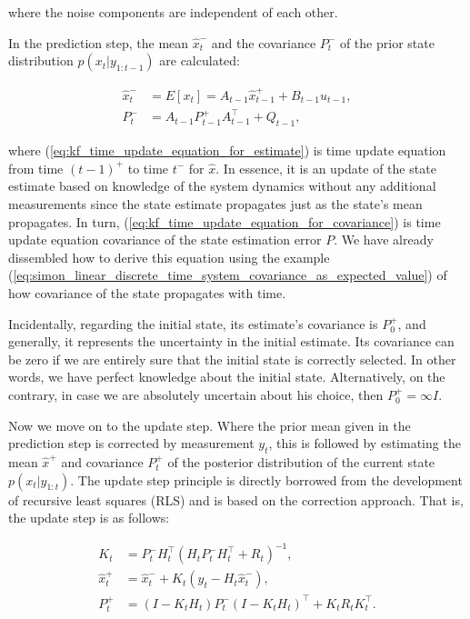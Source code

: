 \noindent where the noise components are independent of each other.

In the prediction step, the mean \(\hat{x}_t^{-}\) and the covariance \(P_t^{-}\) of the prior state distribution \(p(x_t|y_{1:t-1})\) are calculated:

\begin{subequations}
\begin{align}
\hat{x}_t^{-}&=E\left[x_t\right] = A_{t-1} \hat{x}_{t-1}^{+} + B_{t-1} u_{t-1}, \label{eq:kf_time_update_equation_for_estimate} \\
P_t^{-}&=A_{t-1} P_{t-1}^{+} A_{t-1}^\intercal + Q_{t-1}, \label{eq:kf_time_update_equation_for_covariance}
\end{align}
\end{subequations}

\noindent where (\ref{eq:kf_time_update_equation_for_estimate}) is time update equation from time \((t-1)^{+}\) to time \(t^{-}\) for \(\hat{x}\). In essence, it is an update of the state estimate based on knowledge of the system dynamics without any additional measurements since the state estimate propagates just as the state's mean propagates. In turn, (\ref{eq:kf_time_update_equation_for_covariance}) is time update equation covariance of the state estimation error \(P\). We have already dissembled how to derive this equation using the example (\ref{eq:simon_linear_discrete_time_system_covariance_as_expected_value}) of how covariance of the state propagates with time.

Incidentally, regarding the initial state, its estimate's covariance is \(P_0^{+}\), and generally, it represents the uncertainty in the initial estimate. Its covariance can be zero if we are entirely sure that the initial state is correctly selected. In other words, we have perfect knowledge about the initial state. Alternatively, on the contrary, in case we are absolutely uncertain about his choice, then \(P_0^{+} = \infty I\).

Now we move on to the update step. Where the prior mean given in the prediction step is corrected by measurement \(y_t\), this is followed by estimating the mean \(\hat{x}^{+}\) and covariance \(P_t^{+}\) of the posterior distribution of the current state \(p(x_t|y_{1:t})\). The update step principle is directly borrowed from the development of recursive least squares (RLS) and is based on the correction approach. That is, the update step is as follows: 

\begin{equation}
    \begin{aligned}
    K_t &= P_{t}^- H_t^\intercal (H_t P_{t}^{-} H_t^\intercal + R_t)^{-1},\\
\hat{x}_t^+ &= \hat{x}_{t}^{-} + K_t(y_t - H_t \hat{x}_{t}^{-}), \\
P_t^{+} &= (I - K_t H_t) P_{t}^{-} (I - K_t H_t)^\intercal + K_t R_t K_t^\intercal.
    \end{aligned}
\end{equation}

